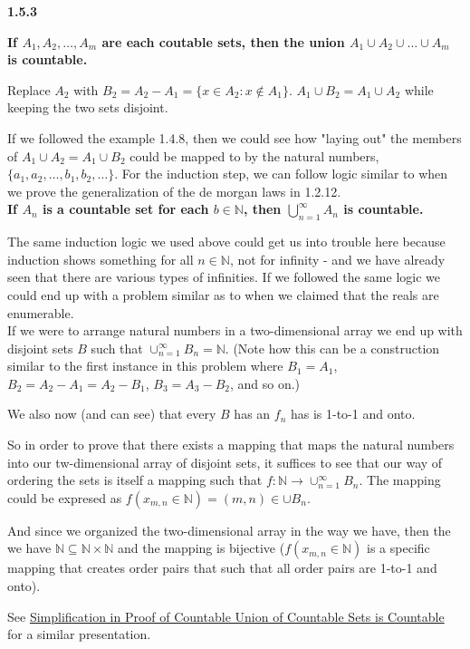 \textbf{1.5.3}

\textbf{If $A_1, A_2, \ldots, A_m$ are each coutable sets, then the union $A_1 \cup A_2 \cup \ldots \cup A_m$ is countable.}

Replace $A_2$ with $B_2 = A_2 - A_1 = \{ x \in A_2 : x \notin A_1 \}$.
$A_1 \cup B_2  = A_1 \cup A_2$ while keeping the two sets disjoint.

If we followed the example 1.4.8, then we could see how "laying out" the members of $A_1 \cup A_2 = A_1 \cup B_2$ could be
mapped to by the natural numbers, $\{ a_1, a_2, \ldots, b_1, b_2, \ldots \}$.
For the induction step, we can follow logic similar to when we prove the generalization of the de morgan laws in 1.2.12.
\\

\textbf{If $A_n$ is a countable set for each $b \in \mathbb{N}$, then $\bigcup^{\infty}_{n=1} A_n$ is countable.}

The same induction logic we used above could get us into trouble here because induction shows something
for all $n \in \mathbb{N}$, not for infinity - and we have already seen that there are various types of infinities.
If we followed the same logic we could end up with a problem similar as to when we claimed that the reals are
enumerable.
\\

If we were to arrange natural numbers in a two-dimensional array we end up with disjoint sets $B$ such that
$\cup^{\infty}_{n=1} B_n = \mathbb{N}$.
(Note how this can be a construction similar to the first instance in this problem where $B_1 = A_1$,
$B_2 = A_2-A_1 = A_2 - B_1$, $B_3 = A_3 - B_2$, and so on.)

We also now (and can see) that every $B$ has an $f_n$ has is 1-to-1 and onto.

So in order to prove that there exists a mapping that maps the natural numbers into our tw-dimensional array of disjoint sets,
it suffices to see that our way of ordering the sets is itself a mapping such that
$f : \mathbb{N} \rightarrow \cup^{\infty}_{n=1} B_n$.
The mapping could be expresed as $f (x_{m,n} \in \mathbb{N}) = (m, n) \in \cup B_n$.

And since we organized the two-dimensional array in the way we have, then the we have
$\mathbb{N} \subseteq \mathbb{N} \times \mathbb{N}$ and the mapping is bijective
($f (x_{m,n} \in \mathbb{N})$ is a specific mapping that creates order pairs that such that all order pairs are 1-to-1 and onto).

See
\href{https://math.stackexchange.com/questions/4403048/simplification-in-proof-of-countable-union-of-countable-sets-is-countable}{Simplification in Proof of Countable Union of Countable Sets is Countable}
for a similar presentation.
\\~\\



